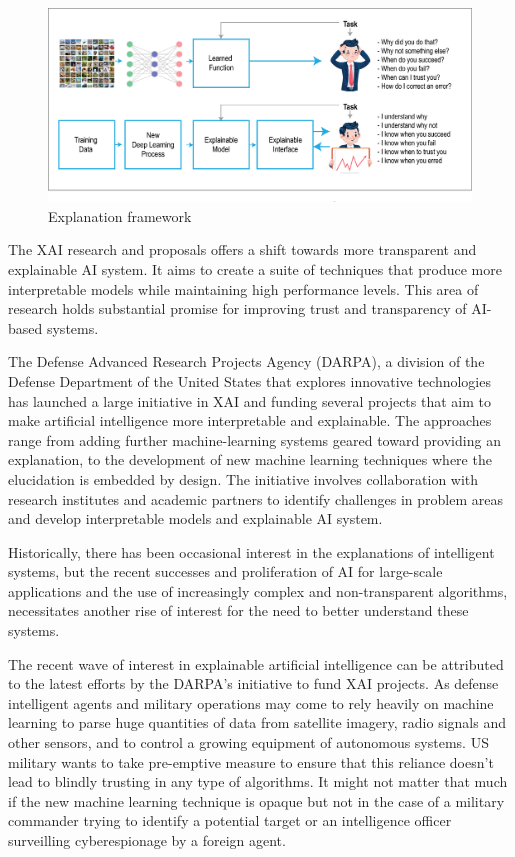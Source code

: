 \begin{figure}[htbp]
\centering
\includegraphics[width=1\textwidth]{images/XAI-concept-copy.eps}
\caption{Explanation framework}
\label{fig:Explanation framework}
\end{figure}

The XAI research and proposals offers a shift towards more transparent and explainable AI system. It aims to create a suite of techniques that produce more interpretable models while maintaining high performance levels. This area of research holds substantial promise for improving trust and transparency of AI-based systems.

The Defense Advanced Research Projects Agency (DARPA), a division of the Defense Department of the United States that explores innovative technologies has launched a large initiative in XAI and funding several projects that aim to make artificial intelligence more interpretable and explainable. The approaches range from adding further machine-learning systems geared toward providing an explanation, to the development of new machine learning techniques where the elucidation is embedded by design. The initiative involves collaboration with research institutes and academic partners to identify challenges in problem areas and develop interpretable models and explainable AI system.

Historically, there has been occasional interest in the explanations of intelligent systems\cite{Abdul}, but the recent successes and proliferation of AI for large-scale applications and the use of increasingly complex and non-transparent algorithms, necessitates another rise of interest for the need to better understand these systems.

The recent wave of interest in explainable artificial intelligence can be attributed to the latest efforts by the DARPA's initiative to fund XAI projects. As defense intelligent agents and military operations may come to rely heavily on machine learning to parse huge quantities of data from satellite imagery, radio signals and other sensors, and to control a growing equipment of autonomous systems. US military wants to take pre-emptive measure to ensure that this reliance doesn’t lead to blindly trusting in any type of algorithms. It might not matter that much if the new machine learning technique is opaque but not in the case of a military commander trying to identify a potential target \cite{Knight2017} or an intelligence officer surveilling cyberespionage by a foreign agent.

